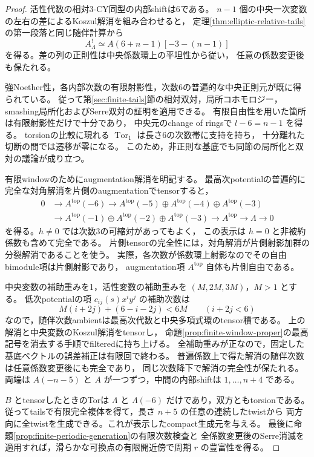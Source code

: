 \begin{proof}
活性代数の相対3-CY同型の内部shiftは6である。
$n-1$ 個の中央一次変数の左右の差によるKoszul解消を組み合わせると，
定理\ref{thm:elliptic-relative-tails}の第一段落と同じ随伴計算から
\[
 A^!_\Lambda\simeq A(6+n-1)[-3-(n-1)]
\]
を得る。差の列の正則性は中央係数環上の平坦性から従い，
任意の係数変更後も保たれる。

強Noether性，各内部次数の有限射影性，次数6の普遍的な中央正則元が既に得られている。
従って第\ref{sec:finite-tails}節の相対双対，局所コホモロジー，
smashing局所化およびSerre双対の証明を適用できる。
有限自由性を用いた箇所は有限射影性だけで十分であり，
中央元のchange of ringsで $l-6=n-1$ を得る。
torsionの比較に現れる $\operatorname{Tor}_1$ は長さ6の次数帯に支持を持ち，
十分離れた切断の間では遷移が零になる。
このため，非正則な基底でも同節の局所化と双対の議論が成り立つ。

有限windowのためにaugmentation解消を明記する。
最高次potentialの普遍的に完全な対角解消を片側のaugmentationでtensorすると，
\[
 \begin{aligned}
 0&\longrightarrow A^{\mathrm{top}}(-6)
   \longrightarrow A^{\mathrm{top}}(-5)\oplus A^{\mathrm{top}}(-4)
                           \oplus A^{\mathrm{top}}(-3)\\
  &\longrightarrow A^{\mathrm{top}}(-1)\oplus A^{\mathrm{top}}(-2)
                           \oplus A^{\mathrm{top}}(-3)
   \longrightarrow A^{\mathrm{top}}\longrightarrow\Lambda\longrightarrow0
 \end{aligned}
\]
を得る。$h\ne0$ では次数3の可縮対があってもよく，
この表示は $h=0$ と非被約係数も含めて完全である。
片側tensorの完全性には，対角解消が片側射影加群の分裂解消であることを使う。
実際，各次数が係数環上射影なのでその自由bimodule項は片側射影であり，
augmentation項 $A^{\mathrm{top}}$ 自体も片側自由である。

中央変数の補助重みを1，活性変数の補助重みを $(M,2M,3M)$，$M>1$ とする。
低次potentialの項 $c_{ij}(s)x^iy^j$ の補助次数は
\[
 M(i+2j)+(6-i-2j)<6M\qquad(i+2j<6)
\]
なので，随伴次数ambientは最高次代数と中央多項式環のtensor積である。
上の解消と中央変数のKoszul解消をtensorし，
命題\ref{prop:finite-window-proper}の最高記号を消去する手順でfilteredに持ち上げる。
全補助重みが正なので，固定した基底ベクトルの誤差補正は有限回で終わる。
普遍係数上で得た解消の随伴次数は任意係数変更後にも完全であり，
同じ次数降下で解消の完全性が保たれる。
両端は $A(-n-5)$ と $A$ が一つずつ，中間の内部shiftは $1,\ldots,n+4$ である。

$B$ とtensorしたときのTorは $\Lambda$ と $\Lambda(-6)$ だけであり，双方ともtorsionである。
従ってtailsで有限完全複体を得て，長さ $n+5$ の任意の連続したtwistから
両方向に全twistを生成できる。これが表示したcompact生成元を与える。
最後に命題\ref{prop:finite-periodic-generation}の有限次数検査と
全係数変更後のSerre消滅を適用すれば，滑らかな可換点の有限開近傍で周期 $r$ の豊富性を得る。
\end{proof}

